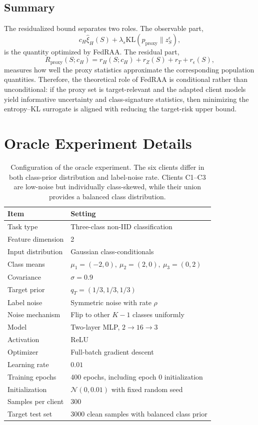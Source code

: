 \documentclass[conference]{IEEEtran}
\theoremstyle{definition}
\theoremstyle{remark}
\begin{document}
\subsection{Summary}
\label{app:proxy_consistency_summary}

The residualized bound separates two roles.
The observable part,
\[
c_H\widehat{\xi}_{H}(S)
+
\lambda_s\mathrm{KL}(p_{\mathrm{proxy}}\|z_S^\epsilon),
\]
is the quantity optimized by FedRAA.
The residual part,
\[
R_{\mathrm{proxy}}(S;c_H)
=
r_H(S;c_H)+r_Z(S)+r_T+r_\epsilon(S),
\]
measures how well the proxy statistics approximate the corresponding population quantities.
Therefore, the theoretical role of FedRAA is conditional rather than unconditional: if the proxy set is target-relevant and the adapted client models yield informative uncertainty and class-signature statistics, then minimizing the entropy--KL surrogate is aligned with reducing the target-risk upper bound.

\section{Oracle Experiment Details}
\label{app:oracle_experiment_details}
\begin{table}[t]
\centering
\caption{Configuration of the oracle experiment. The six clients differ in both class-prior distribution and label-noise rate. Clients C1--C3 are low-noise but individually class-skewed, while their union provides a balanced class distribution.}
\label{tab:oracle_setup}
\setlength{\tabcolsep}{4pt}
\renewcommand{\arraystretch}{1.15}
\begin{tabular}{l|l}
\toprule
\textbf{Item} & \textbf{Setting} \\
\midrule
Task type & Three-class non-IID classification \\
Feature dimension & 2 \\
Input distribution & Gaussian class-conditionals \\
Class means & $\mu_1=(-2,0),\ \mu_2=(2,0),\ \mu_3=(0,2)$ \\
Covariance & $\sigma=0.9$ \\
Target prior & $q_T=(1/3,1/3,1/3)$ \\
Label noise & Symmetric noise with rate $\rho$ \\
Noise mechanism & Flip to other $K-1$ classes uniformly \\
Model & Two-layer MLP, $2 \rightarrow 16 \rightarrow 3$ \\
Activation & ReLU \\
Optimizer & Full-batch gradient descent \\
Learning rate & $0.01$ \\
Training epochs & 400 epochs, including epoch 0 initialization \\
Initialization & $\mathcal{N}(0,0.01)$ with fixed random seed \\
Samples per client & 300 \\
Target test set & 3000 clean samples with balanced class prior \\
\bottomrule
\end{tabular}
\end{table}
\end{document}
